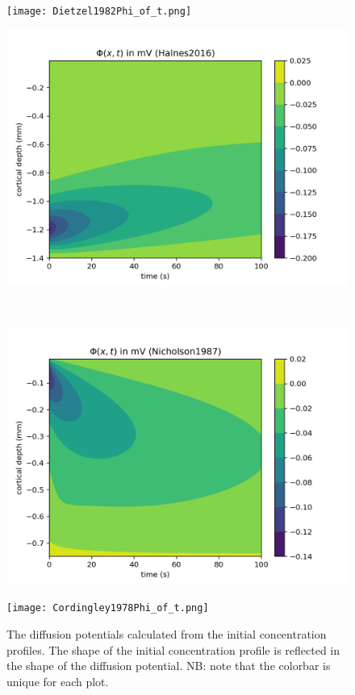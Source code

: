 \documentclass{uiophd}
\begin{document}
\begin{figure}[!tbp]
  \centering
  \begin{minipage}[b]{0.475\textwidth}
    \texttt{[image: Dietzel1982Phi\_of\_t.png]}
  \end{minipage}
  \hfill
  \begin{minipage}[b]{0.475\textwidth}
    \includegraphics[width=\textwidth]{Halnes2016Phi_of_t.png}
  \end{minipage}
  \\
  \vspace{0.05\textwidth}
  \begin{minipage}[b]{0.475\textwidth}
    \includegraphics[width=\textwidth]{Nicholson1987Phi_of_t.png}
  \end{minipage}
  \hfill
  \begin{minipage}[b]{0.475\textwidth}
    \texttt{[image: Cordingley1978Phi\_of\_t.png]}
  \end{minipage}
  \caption{The diffusion potentials calculated from the initial concentration profiles. The shape of the initial concentration profile is reflected in the shape of the diffusion potential. NB: note that the colorbar is unique for each plot.}
  \label{fig:contours}
\end{figure} 
\end{document}
